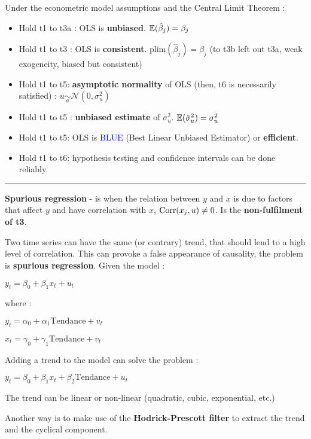 \begin{f}
	
Under the econometric model assumptions and the Central Limit Theorem :

\begin{itemize}[leftmargin=*]
	\item Hold t1 to t3a : OLS is \textbf{unbiased}. $\mathbb{E}(\hat{\beta}_{j}) = \beta_{j}$
	\item Hold t1 to t3 : OLS is \textbf{consistent}. $\mathrm{plim}(\hat{\beta}_{j}) = \beta_{j}$ (to t3b left out t3a, weak exogeneity, biased but consistent)
	\item Hold t1 to t5: \textbf{asymptotic normality} of OLS (then, t6 is necessarily satisfied) : $u \underset{a}{\sim}\mathcal{N}(0, \sigma^{2}_{u})$
	\item Hold t1 to t5 : \textbf{unbiased estimate} of $\sigma^{2}_{u}$. $\mathbb{E}(\hat{\sigma}^{2}_{u}) = \sigma^{2}_{u}$
	\item Hold t1 to t5: OLS is \textcolor{blue}{BLUE} (Best Linear Unbiased Estimator) or \textbf{efficient}.
	\item Hold t1 to t6: hypothesis testing and confidence intervals can be done reliably.
\end{itemize}


\end{f}  \hrule

\begin{f}

\textbf{Spurious regression} - is when the relation between $y$ and $x$ is due to factors that affect $y$ and have correlation with $x$, $\mathrm{Corr}(x_{j}, u) \neq 0$. Is the \textbf {non-fulfilment of t3}.



Two time series can have the same (or contrary) trend, that should lend to a high level of correlation. This can provoke a false appearance of causality, the problem is \textbf{spurious regression}. Given the model :
%
\begin{center}
	$y_{t} = \beta_{0} + \beta_{1} x_{t} + u_{t}$
\end{center}
where :
\begin{center}
	$y_{t} = \alpha_{0} + \alpha_{1} \mathrm{Tendance} + v_{t}$
	
	$x_{t} = \gamma_{0} + \gamma_{1} \mathrm{Tendance} + v_{t}$
\end{center}
Adding a trend to the model can solve the problem :
\begin{center}
	$y_{t} = \beta_{0} + \beta_{1} x_{t} + \beta_{2} \mathrm{Tendance} + u_{t}$
\end{center}
The trend can be linear or non-linear (quadratic, cubic, exponential, etc.)

Another way is to make use of the \textbf{Hodrick-Prescott filter} to extract the trend and the cyclical component.

\end{f}    

